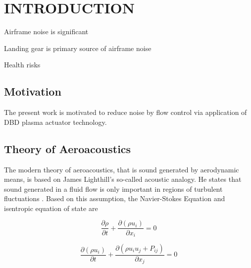 %
%
%
%
%
%
%
%
%
%


%
%

\chapter{INTRODUCTION}
Airframe noise is significant

Landing gear is primary source of airframe noise

Health risks

\section{Motivation}
The present work is motivated to reduce noise by flow control via application of DBD plasma actuator technology.

\section{Theory of Aeroacoustics}
The modern theory of aeroacoustics, that is sound generated by aerodynamic means, is based on James Lighthill's so-called acoustic analogy. He states that sound generated in a fluid flow is only important in regions of turbulent fluctuations \cite{howe2003}. Based on this assumption, the Navier-Stokes Equation and isentropic equation of state are

\begin{equation} \label{eq:1-1}
	\frac{\partial \rho}{\partial t} + \frac{\partial(\rho u_i)}{\partial x_i} = 0
\end{equation}

	\begin{equation} \label{eq:1-2}
		\frac{\partial (\rho u_i)}{\partial t} + \frac{\partial(\rho u_i u_j + P_{ij})}{\partial x_j} = 0
	\end{equation}

